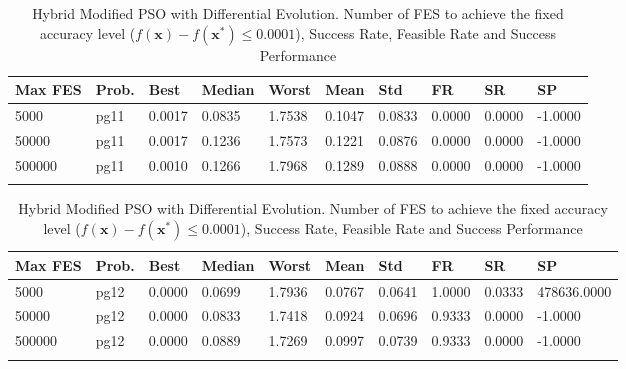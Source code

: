 \documentclass[10pt, a4paper]{book}
\begin{document}
\begin{center}
\begin{longtable}{l l l l l l l l l l}
\textbf{Max FES} & \textbf{Prob.} & \textbf{Best} & \textbf{Median} & \textbf{Worst} & \textbf{Mean} & \textbf{Std} & \textbf{FR} & \textbf{SR} & \textbf{SP} \\
\hline
5000 & pg11 & 0.0017 & 0.0835 & 1.7538 & 0.1047 & 0.0833 & 0.0000 & 0.0000 & -1.0000 \\
50000 & pg11 & 0.0017 & 0.1236 & 1.7573 & 0.1221 & 0.0876 & 0.0000 & 0.0000 & -1.0000 \\
500000 & pg11 & 0.0010 & 0.1266 & 1.7968 & 0.1289 & 0.0888 & 0.0000 & 0.0000 & -1.0000 \\

\caption{ Hybrid Modified PSO with Differential Evolution. Number of FES to achieve the fixed accuracy level ($f(\mathbf{x}) - f(\mathbf{x}^{*}) \leq 0.0001$), Success Rate, Feasible Rate and Success Performance }
\end{longtable}
\end{center}

\begin{center}
\begin{longtable}{l l l l l l l l l l}
\textbf{Max FES} & \textbf{Prob.} & \textbf{Best} & \textbf{Median} & \textbf{Worst} & \textbf{Mean} & \textbf{Std} & \textbf{FR} & \textbf{SR} & \textbf{SP} \\
\hline
5000 & pg12 & 0.0000 & 0.0699 & 1.7936 & 0.0767 & 0.0641 & 1.0000 & 0.0333 & 478636.0000 \\
50000 & pg12 & 0.0000 & 0.0833 & 1.7418 & 0.0924 & 0.0696 & 0.9333 & 0.0000 & -1.0000 \\
500000 & pg12 & 0.0000 & 0.0889 & 1.7269 & 0.0997 & 0.0739 & 0.9333 & 0.0000 & -1.0000 \\

\caption{ Hybrid Modified PSO with Differential Evolution. Number of FES to achieve the fixed accuracy level ($f(\mathbf{x}) - f(\mathbf{x}^{*}) \leq 0.0001$), Success Rate, Feasible Rate and Success Performance }
\end{longtable}
\end{center}
\end{document}

